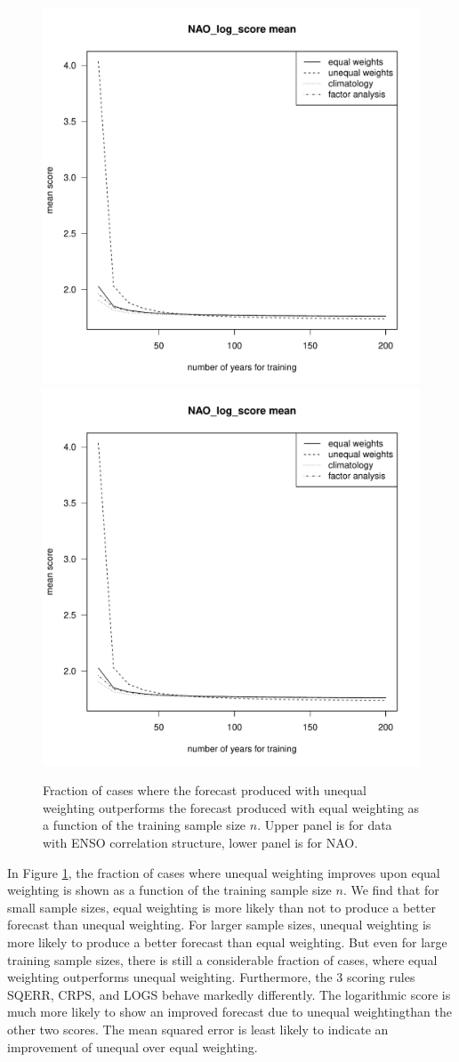 \documentclass[12pt]{article}
\begin{document}
\begin{figure}
\begin{center}
\includegraphics[width=.6\textwidth, page=14]{../R/n-dependence.pdf}\\
\includegraphics[width=.6\textwidth, page=13]{../R/n-dependence.pdf}\\
\end{center}
\caption{Fraction of cases where the forecast produced with unequal weighting outperforms the forecast produced with equal weighting as a function of the training sample size $n$. Upper panel is for data with ENSO correlation structure, lower panel is for NAO.}
\label{fig:prob_impr}
\end{figure}

In Figure \ref{fig:prob_impr}, the fraction of cases where unequal weighting improves upon equal weighting is shown as a function of the training sample size $n$.
We find that for small sample sizes, equal weighting is more likely than not to produce a better forecast than unequal weighting.
For larger sample sizes, unequal weighting is more likely to produce a better forecast than equal weighting.
But even for large training sample sizes, there is still a considerable fraction of cases, where equal weighting outperforms unequal weighting.
Furthermore, the 3 scoring rules SQERR, CRPS, and LOGS behave markedly differently.
The logarithmic score is much more likely to show an improved forecast due to unequal weightingthan the other two scores.
The mean squared error is least likely to indicate an improvement of unequal over equal weighting.
\end{document}
